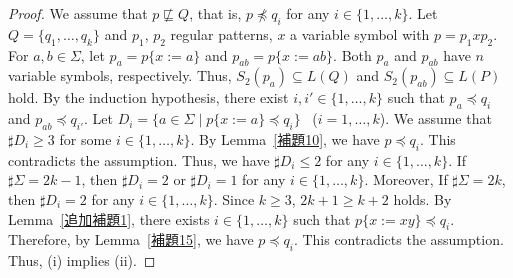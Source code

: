 \begin{proof}
    We assume that $p \not\sqsubseteq Q$, that is, $p \not\preceq q_{i}$
    for any $i \in \{1,\ldots,k\}$.
    Let $Q = \{q_{1},\ldots,q_{k}\}$ and
    $p_{1}$, $p_{2}$ regular patterns, $x$ a variable symbol with
    $p = p_{1}xp_{2}$.
    For $a, b \in \Sigma$,
    let $p_{a}=p\{x:=a\}$ and $p_{ab}=p\{x:=ab\}$.
    Both $p_{a}$ and $p_{ab}$ have $n$ variable symbols, respectively.
    Thus, $S_{2}(p_{a}) \subseteq L(Q)$ and $S_{2}(p_{ab}) \subseteq L(P)$ hold.
    By the induction hypothesis,
    there exist $i, i' \in \{1,\ldots,k\}$ such that
    $p_{a} \preceq q_{i}$ and $p_{ab} \preceq q_{i'}$.
    Let $D_{i} = \{a \in \Sigma \mid p\{x:=a\} \preceq q_{i}\}$ \ ($i=1,\ldots,k$).
    We assume that $\sharp D_{i} \geq 3$ for some $i \in \{1,\ldots, k\}$.
    By Lemma~\ref{補題10}, we have $p \preceq q_{i}$.
    This contradicts the assumption.
    Thus, we have $\sharp D_{i} \leq 2$ for any $i \in \{1,\ldots,k\}$.
    If $\sharp\Sigma = 2k-1$, then
    $\sharp D_{i}=2$ or $\sharp D_{i}=1$ for any $i \in \{1,\ldots,k\}$.
    Moreover,
    If $\sharp\Sigma = 2k$, then
    $\sharp D_{i}=2$ for any $i \in \{1,\ldots,k\}$.
    Since $k \geq 3$, $2k+1 \geq k+2$ holds.
    By Lemma~\ref{追加補題1},
    there exists $i \in \{1,\ldots,k\}$ such that $p\{x:=xy\} \preceq q_{i}$.
    Therefore, by Lemma~\ref{補題15}, we have $p \preceq q_{i}$.
    This contradicts the assumption.
    Thus, (i) implies (ii).
\end{proof}

